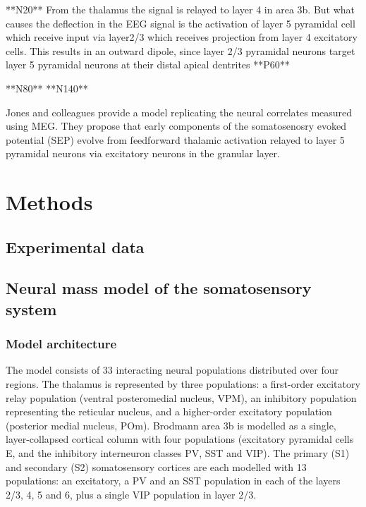 \documentclass[11pt,a4paper,onecolumn]{article}
\begin{document}
**N20**
From the thalamus the signal is relayed to layer 4 in area 3b. But what causes the deflection in the EEG signal is the activation of layer 5 pyramidal cell which receive input via layer2/3 which receives projection from layer 4 excitatory cells.  
This results in an outward dipole, since layer 2/3 pyramidal neurons target layer 5 pyramidal neurons at their distal apical dentrites
**P60**

**N80**
**N140**

Jones and colleagues \cite{jonesNeuralCorrelatesTactile2007} provide a model replicating the neural correlates measured using MEG. They propose that early components of the somatosenosry evoked potential (SEP) evolve from feedforward thalamic activation relayed to layer 5 pyramidal neurons via excitatory neurons in the granular layer. 



\cite{albertiniConsciousTactilePerception2025}

\vspace{-7pt}
\section*{Methods}

\subsection*{Experimental data}


\subsection*{Neural mass model of the somatosensory system}
\vspace{-7pt}

\subsubsection*{Model architecture}
\vspace{-7pt}

The model consists of 33 interacting neural populations distributed over four regions. The thalamus is represented by three populations: a first-order excitatory relay population (ventral posteromedial nucleus, VPM), an inhibitory population representing the reticular nucleus, and a higher-order excitatory population (posterior medial nucleus, POm). Brodmann area 3b is modelled as a single, layer-collapsed cortical column with four populations (excitatory pyramidal cells E, and the inhibitory interneuron classes PV, SST and VIP). The primary (S1) and secondary (S2) somatosensory cortices are each modelled with 13 populations: an excitatory, a PV and an SST population in each of the layers 2/3, 4, 5 and 6, plus a single VIP population in layer 2/3.
\end{document}
